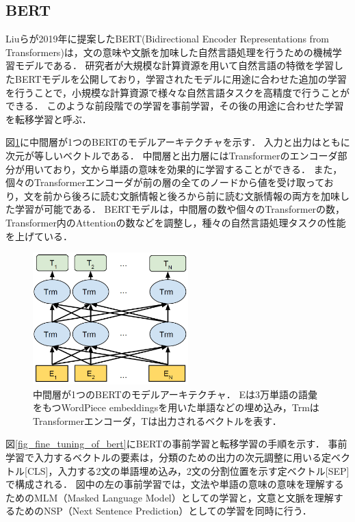 \documentclass[12pt,a4j,dvipdfmx]{jreport}
\begin{document}

\subsection{BERT}
Liuらが2019年に提案したBERT(Bidirectional Encoder Representations from Transformers)は，文の意味や文脈を加味した自然言語処理を行うための機械学習モデルである\cite{aurellen20}\cite{devlin_bert_2019}．
研究者が大規模な計算資源を用いて自然言語の特徴を学習したBERTモデルを公開しており，学習されたモデルに用途に合わせた追加の学習を行うことで，小規模な計算資源で様々な自然言語タスクを高精度で行うことができる．
このような前段階での学習を事前学習，その後の用途に合わせた学習を転移学習と呼ぶ．

図\ref{fig_bert}に中間層が1つのBERTのモデルアーキテクチャを示す．
入力と出力はともに次元が等しいベクトルである．
中間層と出力層にはTransformerのエンコーダ部分が用いており，文から単語の意味を効果的に学習することができる．
また，個々のTransformerエンコーダが前の層の全てのノードから値を受け取っており，文を前から後ろに読む文脈情報と後ろから前に読む文脈情報の両方を加味した学習が可能である．
BERTモデルは，中間層の数や個々のTransformerの数，Transformer内のAttentionの数などを調整し，種々の自然言語処理タスクの性能を上げている．

\begin{figure}[H]
  \centering
  \includegraphics[keepaspectratio, width=60mm]{img/bert.png}
  \caption{
    中間層が1つのBERTのモデルアーキテクチャ\protect\footnotemark[4]．
    Eは3万単語の語彙をもつWordPiece embeddingsを用いた単語などの埋め込み，TrmはTransformerエンコーダ，Tは出力されるベクトルを表す．
  }
  \label{fig_bert}
\end{figure}

図\ref{fig_fine_tuning_of_bert}にBERTの事前学習と転移学習の手順を示す．
事前学習で入力するベクトルの要素は，分類のための出力の次元調整に用いる定ベクトル[CLS]，入力する2文の単語埋め込み，2文の分割位置を示す定ベクトル[SEP]で構成される．
図中の左の事前学習では，文法や単語の意味の意味を理解するためのMLM（Masked Language Model）としての学習と，文意と文脈を理解するためのNSP（Next Sentence Prediction）としての学習を同時に行う．
\end{document}

